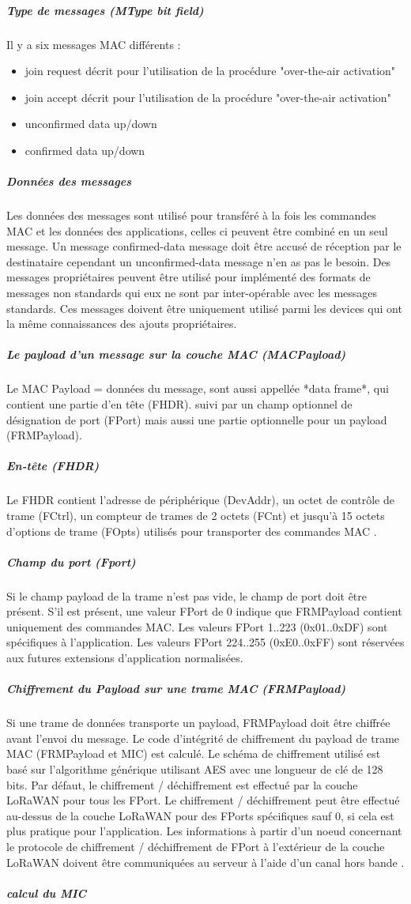 \documentclass[11pt]{article}
\begin{document}
\subparagraph{ Type de messages (MType bit field)}
Il y a six messages MAC différents : 
\begin{itemize}
\item join request décrit pour l'utilisation de la procédure "over-the-air activation"
\item join accept décrit pour l'utilisation de la procédure "over-the-air activation"
\item unconfirmed data up/down
\item confirmed data up/down
\end{itemize}

\subparagraph{Données des messages}

Les données des messages sont utilisé pour transféré à la fois les commandes MAC et les données des applications, celles ci peuvent être combiné en un seul message. Un message confirmed-data message doit être accusé de réception par le destinataire cependant un unconfirmed-data message n'en as pas le besoin. Des messages propriétaires peuvent être utilisé pour implémenté des formats de messages non standards qui eux ne sont par inter-opérable avec les messages standards. Ces messages doivent être uniquement utilisé parmi les devices qui ont la même connaissances des ajouts propriétaires.

\subparagraph{ Le payload d'un message sur la couche MAC (MACPayload)}
Le MAC Payload = données du message, sont aussi appellée *data frame*, qui contient une partie d'en tête (FHDR). suivi par un champ optionnel de désignation de port (FPort) mais aussi une partie optionnelle pour un payload (FRMPayload).


\subparagraph{ En-tête (FHDR)}
Le FHDR contient l'adresse de périphérique  (DevAddr), un octet de contrôle de trame (FCtrl), un compteur de trames de 2 octets (FCnt) et jusqu'à 15 octets d'options de trame (FOpts) utilisés pour transporter des commandes MAC .

\subparagraph{Champ du port (Fport)}
Si le champ payload  de la trame n'est pas vide, le champ de port doit être présent. S'il est présent, une valeur FPort de 0 indique que FRMPayload contient uniquement des commandes MAC. Les valeurs FPort 1..223 (0x01..0xDF) sont spécifiques à l'application. Les valeurs FPort 224..255 (0xE0..0xFF) sont réservées aux futures extensions d'application normalisées.

\subparagraph{Chiffrement du Payload sur une trame MAC (FRMPayload)}
Si une trame de données transporte un payload, FRMPayload doit être chiffrée avant l'envoi du  message.
Le code d'intégrité de chiffrement du payload de trame MAC (FRMPayload et MIC) est calculé. Le schéma de chiffrement utilisé est basé sur l'algorithme générique utilisant AES avec une longueur de clé de 128 bits. Par défaut, le chiffrement / déchiffrement est effectué par la couche LoRaWAN pour tous les FPort. Le chiffrement / déchiffrement peut être effectué au-dessus de la couche LoRaWAN pour des FPorts spécifiques sauf 0, si cela est plus pratique pour l'application. Les informations  à partir d'un noeud concernant le protocole de chiffrement / déchiffrement de FPort à l'extérieur de la couche LoRaWAN doivent être communiquées au serveur à l'aide d'un canal hors bande .
\subparagraph{calcul du MIC}
\end{document}
